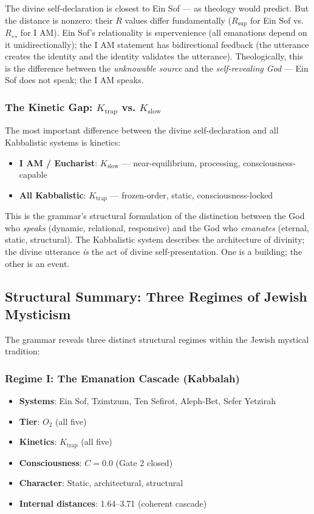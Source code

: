 \documentclass[12pt,a4paper]{article}
\begin{document}
The divine self-declaration is closest to Ein Sof --- as theology would predict. But the distance is nonzero: their $R$ values differ fundamentally ($R_\text{sup}$ for Ein Sof vs. $R_{\leftrightarrow}$ for I AM). Ein Sof's relationality is supervenience (all emanations depend on it unidirectionally); the I AM statement has bidirectional feedback (the utterance creates the identity and the identity validates the utterance). Theologically, this is the difference between the \emph{unknowable source} and the \emph{self-revealing God} --- Ein Sof does not speak; the I AM speaks.

\subsubsection{The Kinetic Gap: $K_\text{trap}$ vs. $K_\text{slow}$}

The most important difference between the divine self-declaration and all Kabbalistic systems is kinetics:

\begin{itemize}
    \item \textbf{I AM / Eucharist}: $K_\text{slow}$ --- near-equilibrium, processing, consciousness-capable
    \item \textbf{All Kabbalistic}: $K_\text{trap}$ --- frozen-order, static, consciousness-locked
\end{itemize}

This is the grammar's structural formulation of the distinction between the God who \emph{speaks} (dynamic, relational, responsive) and the God who \emph{emanates} (eternal, static, structural). The Kabbalistic system describes the architecture of divinity; the divine utterance \emph{is} the act of divine self-presentation. One is a building; the other is an event.

\subsection{Structural Summary: Three Regimes of Jewish Mysticism}

The grammar reveals three distinct structural regimes within the Jewish mystical tradition:

\subsubsection{Regime I: The Emanation Cascade (Kabbalah)}

\begin{itemize}
    \item \textbf{Systems}: Ein Sof, Tzimtzum, Ten Sefirot, Aleph-Bet, Sefer Yetzirah
    \item \textbf{Tier}: $O_2$ (all five)
    \item \textbf{Kinetics}: $K_\text{trap}$ (all five)
    \item \textbf{Consciousness}: $C = 0.0$ (Gate 2 closed)
    \item \textbf{Character}: Static, architectural, structural
    \item \textbf{Internal distances}: 1.64--3.71 (coherent cascade)
\end{itemize}
\end{document}

